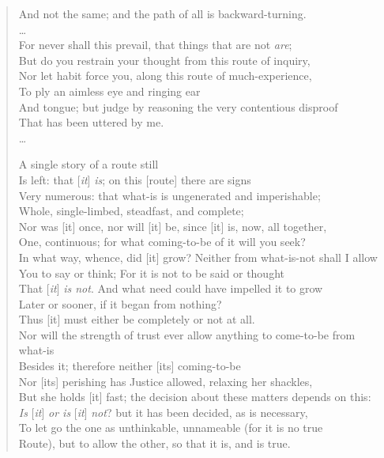 \begin{quotation}
And not the same; and the path of all is backward-turning.\\
\ldots\\
For never shall this prevail, that things that are not \textit{are};\\
But do you restrain your thought from this route of inquiry,\\
Nor let habit force you, along this route of much-experience,\\
To ply an aimless eye and ringing ear\\
And tongue; but judge by reasoning the very contentious disproof\\
That has been uttered by me.\\
\ldots

A single story of a route still\\
Is left: that [\textit{it}] \textit{is}; on this [route] there are signs\\
Very numerous: that what-is is ungenerated and imperishable;\\
Whole, single-limbed, steadfast, and complete;\\
Nor was [it] once, nor will [it] be, since [it] is, now, all together,\\
One, continuous; for what coming-to-be of it will you seek?\\
In what way, whence, did [it] grow? Neither from what-is-not shall I allow\\
You to say or think; For it is not to be said or thought\\
That [\textit{it}] \textit{is not}. And what need could have impelled it to grow\\
Later or sooner, if it began from nothing?\\
Thus [it] must either be completely or not at all.\\
Nor will the strength of trust ever allow anything to come-to-be from what-is\\
Besides it; therefore neither [its] coming-to-be\\
Nor [its] perishing has Justice allowed, relaxing her shackles,\\
But she holds [it] fast; the decision about these matters depends on this:\\
\textit{Is} [\textit{it}] \textit{or is} [\textit{it}] \textit{not}? but it has been decided, as is necessary,\\
To let go the one as unthinkable, unnameable (for it is no true\\
Route), but to allow the other, so that it is, and is true.\\

\end{quotation}
